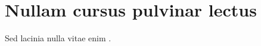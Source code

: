 \documentclass[12pt]{report}
\begin{document}
\clearpage
\linenumbers %
\modulolinenumbers[3] %
\chapter{Nullam cursus pulvinar lectus}
\lipsum[2-10] 
Sed lacinia nulla vitae enim \citep{Rodrigues2016}.






\end{document}
